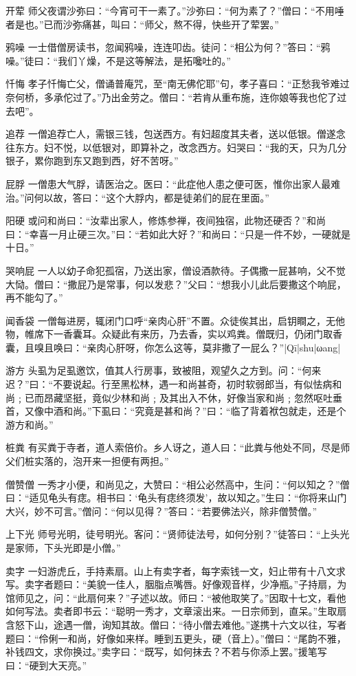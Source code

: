 \documentclass[12pt,UTF8]{ctexbook}
\begin{document}
开荤
师父夜谓沙弥曰：“今宵可干一素了。”沙弥曰：“何为素了？”僧曰：“不用唾者是也。”已而沙弥痛甚，叫曰：“师父，熬不得，快些开了荤罢。”

鸦噪
一士借僧房读书，忽闻鸦噪，连连叩齿。徒问：“相公为何？”答曰：“鸦噪。”徒曰：“我们丫燥，不是这等解法，是拓嚵吐的。”

忏悔
孝子忏悔亡父，僧诵普庵咒，至“南无佛佗耶”句，孝子喜曰：“正愁我爷难过奈何桥，多承佗过了。”乃出金劳之。僧曰：“若肯从重布施，连你娘等我也佗了过去吧”。

追荐
一僧追荐亡人，需银三钱，包送西方。有妇超度其夫者，送以低银。僧遂念往东方。妇不悦，以低银对，即算补之，改念西方。妇哭曰：“我的天，只为几分银子，累你跑到东又跑到西，好不苦呀。”

屁脬
一僧患大气脬，请医治之。医曰：“此症他人患之便可医，惟你出家人最难治。”问何以故，答曰：“这个大脬内，都是徒弟们的屁在里面。”

阳硬
或问和尚曰：“汝辈出家人，修炼参禅，夜间独宿，此物还硬否？”和尚曰：“幸喜一月止硬三次。”曰：“若如此大好？”和尚曰：“只是一件不妙，一硬就是十日。”

哭响屁
一人以幼子命犯孤宿，乃送出家，僧设酒款待。子偶撒一屁甚响，父不觉大恸。僧曰：“撒屁乃是常事，何以发悲？”父曰：“想我小儿此后要撒这个响屁，再不能勾了。”

闻香袋
一僧每进房，辄闭门口呼“亲肉心肝”不置。众徒俟其出，启钥瞷之，无他物，帷席下一香囊耳。众疑此有来历，乃去香，实以鸡粪。僧既归，仍闭门取香囊，且嗅且唤曰：“亲肉心肝呀，你怎么这等，莫非撒了一屁么？”|Qī|shu|ωang|

游方
头虱为足虱邀饮，值其人行房事，致被阻，观望久之方到。问：“何来迟？”曰：“不要说起。行至黑松林，遇一和尚甚奇，初时软弱郎当，有似怯病和尚﹔已而昂藏坚挺，竟似少林和尚﹔及其出入不休，好像当家和尚﹔忽然呕吐垂首，又像中酒和尚。”下虱曰：“究竟是甚和尚？”曰：“临了背着袱包就走，还是个游方和尚。”

桩粪
有买粪于寺者，道人索倍价。乡人讶之，道人曰：“此粪与他处不同，尽是师父们桩实落的，泡开来一担便有两担。”

僧赞僧
一秀才小便，和尚见之，大赞曰：“相公必然高中，生问：“何以知之？”僧曰：“适见龟头有痣。相书曰：‘龟头有痣终须发’，故以知之。”生曰：“你将来山门大兴，妙不可言。”僧问：“何以见得？”答曰：“若要佛法兴，除非僧赞僧。”

上下光
师号光明，徒号明光。客问：“贤师徒法号，如何分别？”徒答曰：“上头光是家师，下头光即是小僧。”

卖字
一妇游虎丘，手持素扇。山上有卖字者，每字索钱一文，妇止带有十八文求写。卖字者题曰：“美貌一佳人，胭脂点嘴唇。好像观音样，少净瓶。”子持扇，为馆师见之，问：“此扇何来？”子述以故。师曰：“被他取笑了。”因取十七文，看他如何写法。卖者即书云：“聪明一秀才，文章滚出来。一日宗师到，直呆。”生取扇含怒下山，途遇一僧，询知其故。僧曰：“待小僧去难他。”遂携十六文以往，写者题曰：“伶俐一和尚，好像如来样。睡到五更头，硬（音上）。”僧曰：“尾韵不雅，补钱四文，求你换过。”卖字曰：“既写，如何抹去？不若与你添上罢。”援笔写曰：“硬到大天亮。”
\end{document}
